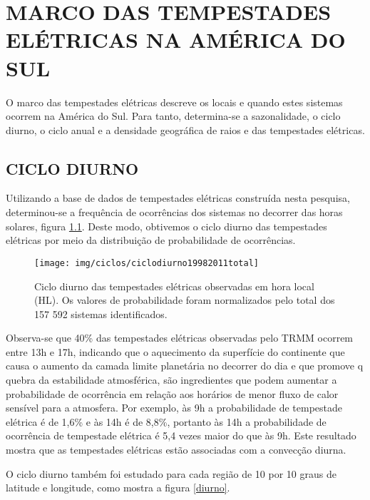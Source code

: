 \chapter{MARCO DAS TEMPESTADES ELÉTRICAS NA AMÉRICA DO SUL}

O marco das tempestades elétricas descreve os locais e quando estes sistemas ocorrem na América do Sul. Para tanto, determina-se a sazonalidade, o ciclo diurno, o ciclo anual e a densidade geográfica de raios e das tempestades elétricas.

\section{CICLO DIURNO}


Utilizando a base de dados de tempestades elétricas construída nesta pesquisa, determinou-se a frequência de ocorrências dos sistemas no decorrer das horas solares, figura \ref{ciclodiurnototal}. Deste modo, obtivemos o ciclo diurno das tempestades elétricas por meio da distribuição de probabilidade de ocorrências.

\begin{figure}[!hb]
  \centering
  {{\texttt{[image: img/ciclos/ciclodiurno19982011total]}}}
\caption{Ciclo diurno das tempestades elétricas observadas em hora local (HL). Os valores de probabilidade foram normalizados pelo total dos {157 592} sistemas identificados.}
\label{ciclodiurnototal}
\end{figure} 

Observa-se que 40\%  das tempestades elétricas observadas pelo TRMM ocorrem entre 13h e 17h, indicando que o aquecimento da superfície do continente que causa o aumento da camada limite planetária no decorrer do dia e que promove q quebra da estabilidade atmosférica, são ingredientes que podem aumentar a probabilidade de ocorrência em relação aos horários de menor fluxo de calor sensível para a atmosfera. Por exemplo, às 9h a probabilidade de tempestade elétrica é de 1,6\% e às 14h é de 8,8\%, portanto às 14h a probabilidade de ocorrência de tempestade elétrica é 5,4 vezes maior do que às 9h. Este resultado mostra que as tempestades elétricas estão associadas com a convecção diurna.


O ciclo diurno também foi estudado para cada região de 10 por 10 graus de latitude e longitude, como mostra a figura \ref{diurno}. 

